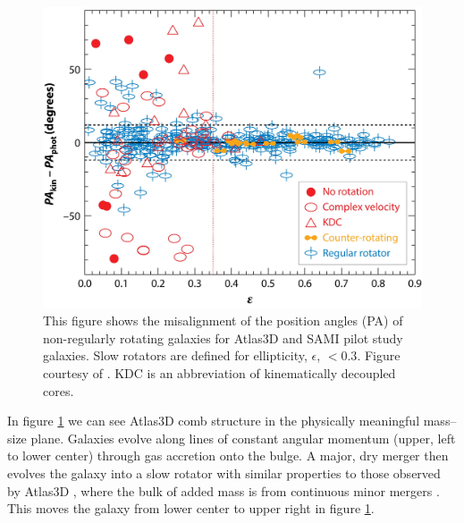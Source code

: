 {{	\begin{figure}
		\centering
		\includegraphics[width=\textwidth]{introduction/misalignment.jpg}
		\caption[The kinematic--photometric misalignment in slow rotators]{This figure shows the misalignment of the position angles (PA) of non-regularly rotating galaxies for Atlas3D and SAMI pilot study galaxies. Slow rotators are defined for ellipticity, $\epsilon$, $<0.3$. Figure courtesy of \citet{Cappellari2016}. KDC is an abbreviation of kinematically decoupled cores.}
		\label{fig:introMassRe}
	\end{figure}

	In figure \ref{fig:introMassRe} we can see Atlas3D comb structure in the physically meaningful mass--size plane. Galaxies evolve along lines of constant angular momentum (upper, left to lower center) through gas accretion onto the bulge. A major, dry merger then evolves the galaxy into a slow rotator \citep{Bendo2000} with similar properties to those observed by Atlas3D \citep{Jesseit2007, Jesseit2009}, where the bulk of added mass is from continuous minor mergers \cite{DeLucia2007, Genel2008, Feldmann2010, Oser2010, Feldmann2011, Hirschmann2012}. This moves the galaxy from lower center to upper right in figure \ref{fig:introMassRe}. 

}}
